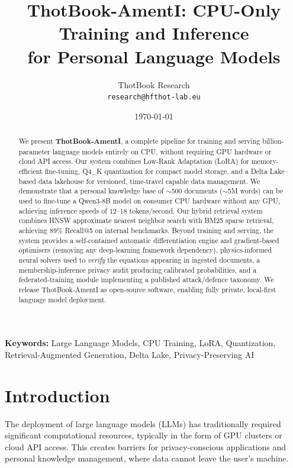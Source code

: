 \documentclass[11pt,a4paper]{article}
\title{ThotBook-AmentI: CPU-Only Training and Inference\\
       for Personal Language Models}
\author{
    ThotBook Research\\
    \texttt{research@hfthot-lab.eu}
}
\date{\today}
\theoremstyle{plain}
\theoremstyle{definition}
\begin{document}
\maketitle

\begin{abstract}
We present \textbf{ThotBook-AmentI}, a complete pipeline for training and
serving billion-parameter language models entirely on CPU, without requiring
GPU hardware or cloud API access. Our system combines Low-Rank Adaptation
(LoRA) for memory-efficient fine-tuning, Q4\_K quantization for compact model
storage, and a Delta Lake--based data lakehouse for versioned, time-travel
capable data management. We demonstrate that a personal knowledge base of
$\sim$500 documents ($\sim$5M words) can be used to fine-tune a Qwen3-8B model
on consumer CPU hardware without any GPU, achieving
inference speeds of 12--18 tokens/second. Our hybrid retrieval system combines
HNSW approximate nearest neighbor search with BM25 sparse retrieval, achieving
89\% Recall@5 on internal benchmarks. Beyond training and serving, the system provides a self-contained automatic
differentiation engine and gradient-based optimisers (removing any
deep-learning framework dependency), physics-informed neural solvers used to
\emph{verify} the equations appearing in ingested documents, a
membership-inference privacy audit producing calibrated probabilities, and a
federated-training module implementing a published attack/defence taxonomy.
We release ThotBook-AmentI as open-source software, enabling fully private,
local-first language model deployment.
\end{abstract}

\textbf{Keywords:} Large Language Models, CPU Training, LoRA, Quantization,
Retrieval-Augmented Generation, Delta Lake, Privacy-Preserving AI

\section{Introduction}
\label{sec:intro}

The deployment of large language models (LLMs) has traditionally required
significant computational resources, typically in the form of GPU clusters
or cloud API access. This creates barriers for privacy-conscious applications
and personal knowledge management, where data cannot leave the user's machine.
\end{document}

